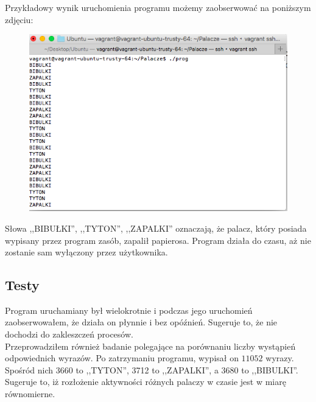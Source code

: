 \documentclass{article}
\begin{document}
Przykładowy wynik uruchomienia programu możemy zaobserwować na poniższym zdjęciu:

\begin{figure}[h!]
\centering
\includegraphics[scale=0.4]{zrzut_ekranu}	
\end{figure}

Słowa ,,BIBUŁKI'', ,,TYTON'', ,,ZAPALKI'' oznaczają, że palacz, który posiada wypisany przez program zasób, zapalił papierosa. Program działa do czasu, aż nie zostanie sam wyłączony przez użytkownika.

\subsection{Testy}

Program uruchamiany był wielokrotnie i podczas jego uruchomień zaobserwowałem, że działa on płynnie i bez opóźnień. Sugeruje to, że nie dochodzi do zakleszczeń procesów.\\

Przeprowadziłem również badanie polegające na porównaniu liczby wystąpień odpowiednich wyrazów. Po zatrzymaniu programu, wypisał on $11052$ wyrazy. Spośród nich 3660 to ,,TYTON'', 3712 to ,,ZAPALKI'', a 3680 to ,,BIBULKI''. Sugeruje to, iż rozłożenie aktywności różnych palaczy w czasie jest w miarę równomierne.  
\end{document}
